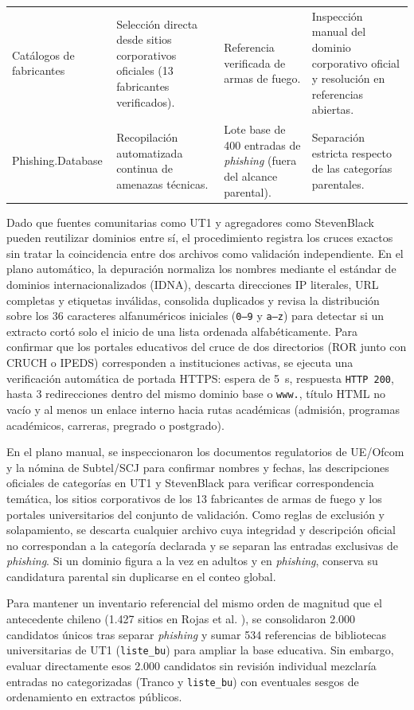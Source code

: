 \documentclass[10pt,a4paper]{article}
\begin{document}
\begin{table}[H]
\begin{tabularx}{\textwidth}{>{\raggedright\arraybackslash}p{2.35cm}>{\raggedright\arraybackslash}p{3.45cm}>{\raggedright\arraybackslash}p{3.45cm}Y}
Catálogos de fabricantes & Selección directa desde sitios corporativos oficiales (13 fabricantes verificados). & Referencia verificada de armas de fuego. & Inspección manual del dominio corporativo oficial y resolución en referencias abiertas.\\
Phishing.Database \cite{phishingdatabase} & Recopilación automatizada continua de amenazas técnicas. & Lote base de 400 entradas de \emph{phishing} (fuera del alcance parental). & Separación estricta respecto de las categorías parentales.\\
\bottomrule
\end{tabularx}
\end{table}

Dado que fuentes comunitarias como UT1 y agregadores como StevenBlack pueden reutilizar dominios entre sí, el procedimiento registra los cruces exactos sin tratar la coincidencia entre dos archivos como validación independiente. En el plano automático, la depuración normaliza los nombres mediante el estándar de dominios internacionalizados (IDNA), descarta direcciones IP literales, URL completas y etiquetas inválidas, consolida duplicados y revisa la distribución sobre los 36 caracteres alfanuméricos iniciales (\texttt{0--9} y \texttt{a--z}) para detectar si un extracto cortó solo el inicio de una lista ordenada alfabéticamente. Para confirmar que los portales educativos del cruce de dos directorios (ROR junto con CRUCH o IPEDS) corresponden a instituciones activas, se ejecuta una verificación automática de portada HTTPS: espera de 5~s, respuesta \texttt{HTTP 200}, hasta 3 redirecciones dentro del mismo dominio base o \texttt{www.}, título HTML no vacío y al menos un enlace interno hacia rutas académicas (admisión, programas académicos, carreras, pregrado o postgrado).

En el plano manual, se inspeccionaron los documentos regulatorios de UE/Ofcom y la nómina de Subtel/SCJ para confirmar nombres y fechas, las descripciones oficiales de categorías en UT1 y StevenBlack para verificar correspondencia temática, los sitios corporativos de los 13 fabricantes de armas de fuego y los portales universitarios del conjunto de validación. Como reglas de exclusión y solapamiento, se descarta cualquier archivo cuya integridad y descripción oficial no correspondan a la categoría declarada y se separan las entradas exclusivas de \emph{phishing}. Si un dominio figura a la vez en adultos y en \emph{phishing}, conserva su candidatura parental sin duplicarse en el conteo global.

Para mantener un inventario referencial del mismo orden de magnitud que el antecedente chileno (1.427 sitios en Rojas et al. \cite{rojas2025ieee}), se consolidaron 2.000 candidatos únicos tras separar \emph{phishing} y sumar 534 referencias de bibliotecas universitarias de UT1 (\texttt{liste\_bu}) para ampliar la base educativa. Sin embargo, evaluar directamente esos 2.000 candidatos sin revisión individual mezclaría entradas no categorizadas (Tranco y \texttt{liste\_bu}) con eventuales sesgos de ordenamiento en extractos públicos.
\end{document}
